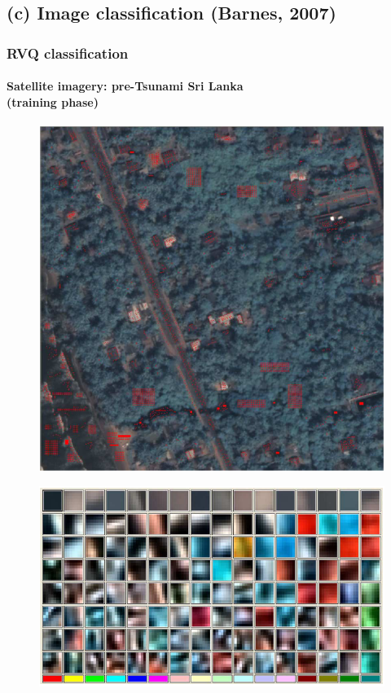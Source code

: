 \subsection{(c) Image classification (Barnes, 2007)}
\begin{frame}
\frametitle{RVQ classification}
\framesubtitle{\small Satellite imagery: pre-Tsunami Sri Lanka \\(training phase)}
\logoCSIPCPL\mypagenum
	\begin{figure}		
		\includegraphics[height=0.35\textheight]{thesis/RVQ_SatelliteSriLanka_1_snippets.png}			
	\end{figure}
	\begin{figure}		
		\includegraphics[height=0.40\textheight]{thesis/RVQ_SatelliteSriLanka_2_codebooks.png}			
	\end{figure}
\end{frame}




